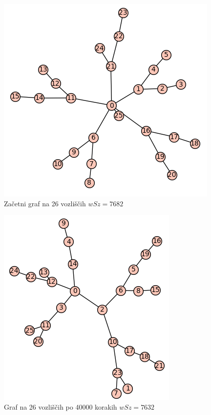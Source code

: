 \documentclass[12pt, a4paper]{article}
\begin{document}
\begin{figure}[h]
\centering
\includegraphics[scale=0.4]{iskanje_graf26}
\caption{Začetni graf na 26 vozliščih $wSz = 7682$}
\end{figure}

\begin{figure}[h]
\centering
\includegraphics[scale=0.4]{iskanje_graf26_2}
\caption{Graf na 26 vozliščih po 40000 korakih $wSz = 7632$}
\end{figure}

\newpage
\end{document}
